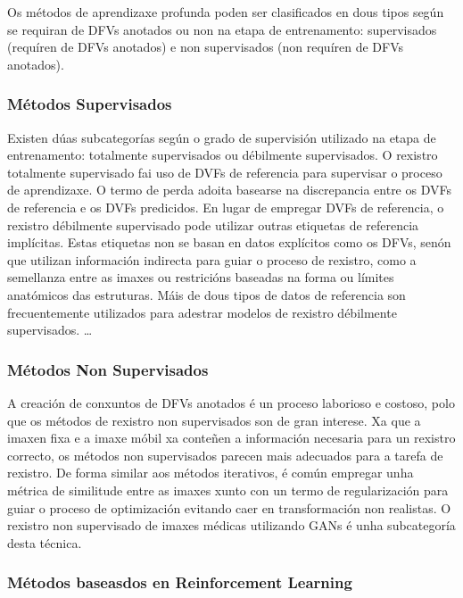 Os métodos de aprendizaxe profunda poden ser clasificados en dous tipos según se requiran de DFVs anotados ou non na etapa de entrenamento: 
supervisados (requíren de DFVs anotados) e non supervisados (non requíren de DFVs anotados).

\subsubsection{Métodos Supervisados}
\label{subsubsec:Métodos Supervisados}

Existen dúas subcategorías según o grado de supervisión utilizado na etapa de entrenamento: totalmente supervisados ou débilmente supervisados.
O rexistro totalmente supervisado fai uso de DVFs de referencia para supervisar o proceso de aprendizaxe.
 O termo de perda adoita basearse na discrepancia entre os DVFs de referencia e os DVFs predicidos.
 En lugar de empregar DVFs de referencia, o rexistro débilmente supervisado pode utilizar outras etiquetas de referencia implícitas.
 Estas etiquetas non se basan en datos explícitos como os DFVs, senón que utilizan información indirecta para guiar o proceso de rexistro, como a semellanza entre as imaxes ou restricións baseadas na forma ou límites anatómicos das estruturas.
 Máis de dous tipos de datos de referencia son frecuentemente utilizados para adestrar modelos de rexistro débilmente supervisados. \cite{bharati2022deeplearningmedicalimage}
\dots

\subsubsection{Métodos Non Supervisados}
\label{subsubsec:Métodos Non Supervisados}

A creación de conxuntos de DFVs anotados é un proceso laborioso e costoso, polo que os métodos de rexistro non supervisados son de gran interese.
Xa que a imaxen fixa e a imaxe móbil xa conteñen a información necesaria para un rexistro correcto, os métodos non supervisados parecen mais adecuados para a tarefa de rexistro.
De forma similar aos métodos iterativos, é común empregar unha métrica de similitude entre as imaxes xunto con un termo de regularización para guiar o proceso de optimización evitando caer en transformación non realistas.
O rexistro non supervisado de imaxes médicas utilizando GANs é unha subcategoría desta técnica.

\subsubsection{Métodos baseasdos en Reinforcement Learning}
\label{subsubsec:Métodos baseados en Reinforcement Learning}



